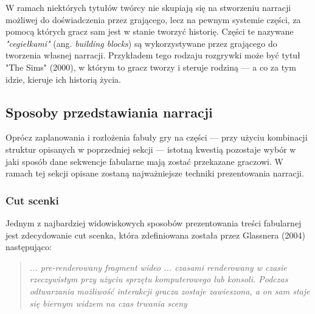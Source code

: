 W ramach niektórych tytułów twórcy nie skupiają się na stworzeniu narracji możliwej do doświadczenia
przez grającego, lecz na pewnym systemie części, za pomocą których gracz sam jest w stanie tworzyć
historię. Części te nazywane \textit{"cegiełkami"} (ang. \textit{building blocks})\cite{theorising_narrative}
są wykorzystywane przez grającego do tworzenia własnej narracji. Przykładem tego rodzaju rozgrywki
może być tytuł "The Sims" (2000), w którym to gracz tworzy i steruje rodziną --- a co za tym idzie,
kieruje ich historią życia.

\subsection{Sposoby przedstawiania narracji}\label{subsection:ch1_2_2}

Oprócz zaplanowania i rozłożenia fabuły gry na części --- przy użyciu kombinacji struktur opisanych
w poprzedniej sekcji --- istotną kwestią pozostaje wybór w jaki sposób dane sekwencje fabularne
mają zostać przekazane graczowi. W ramach tej sekcji opisane zostaną najważniejsze techniki
prezentowania narracji.

\subsubsection*{Cut scenki}

Jednym z najbardziej widowiskowych sposobów prezentowania treści fabularnej jest zdecydowanie
cut scenka, która zdefiniowana została przez Glassnera (2004) następująco:

\begin{quotation}
	\textit{... pre-renderowany fragment wideo ... czasami renderowany w czasie rzeczywistym przy
		użyciu sprzętu komputerowego lub konsoli. Podczas odtwarzania możliwość interakcji gracza
		zostaje zawieszona, a on sam staje się biernym widzem na czas trwania sceny}\cite{narrative_structures}
\end{quotation}

